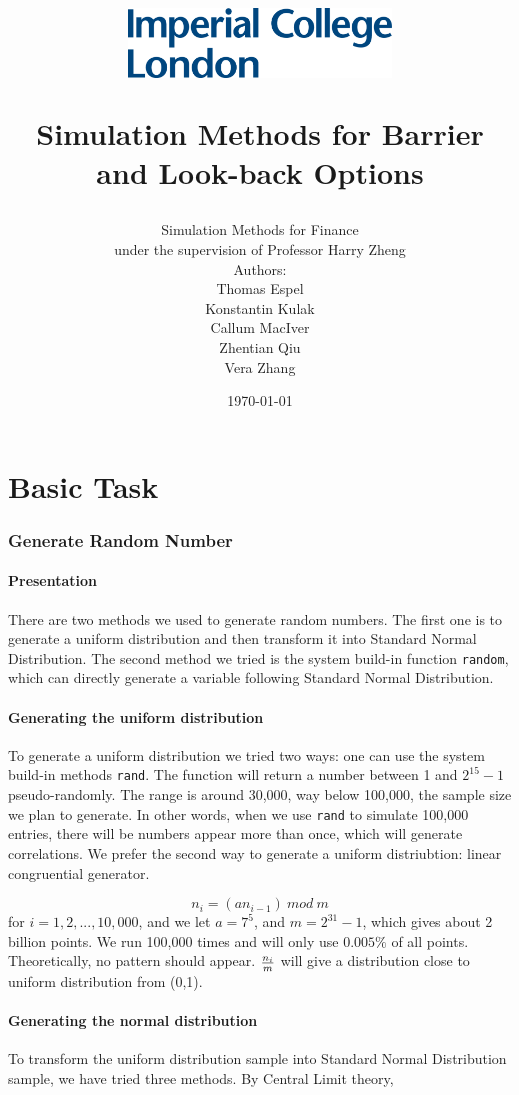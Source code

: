 \documentclass[11pt,a4paper,fleqn]{article}
\author{{\LARGE Simulation Methods for Finance}\\under the supervision of Professor Harry Zheng
\\[5cm] Authors:\\
Thomas Espel\\ Konstantin Kulak\\ Callum MacIver\\Zhentian Qiu\\Vera Zhang\\[6.5cm]}
\title{\vspace*{-2cm}\begin{flushleft}\includegraphics[width=7cm]{imperial.png}\end{flushleft}
\vspace*{4cm}
\Huge\sffamily Simulation Methods for Barrier and Look-back Options}
\date{\sffamily\today}
\begin{document}
\maketitle
\thispagestyle{empty}

\newpage
\tableofcontents
\newpage
{}
\setcounter{page}{1}

\part{Basic Task}
\section{Generate Random Number}
\subsection{Presentation}
There are two methods we used to generate random numbers.
The first one is to generate a uniform distribution and then transform it into Standard Normal Distribution. The second method we tried is the system build-in function \texttt{random}, which can directly generate a variable following Standard Normal Distribution.
\subsection{Generating the uniform distribution}
To generate a uniform distribution we tried two ways: one can use the system build-in methods \texttt{rand}. The function will return a number between 1 and $2^{15} -1$ pseudo-randomly. The range is around 30,000, way below 100,000, the sample size we plan to generate. In other words, when we use \texttt{rand} to simulate 100,000 entries, there will be numbers appear more than once, which will generate correlations. We prefer the second way to generate a uniform distriubtion: linear congruential generator.

$$n_i = (an_{i-1}) \ mod\ m$$for $i=1,2,...,10,000$, and we let $ a = 7^5$, and $m = 2^{31}-1$, which gives about 2 billion points. We run 100,000 times and will only use $0.005\%$ of all points. Theoretically, no pattern should appear. ${n_i \over m}$ will give a distribution close to uniform distribution from (0,1).

\subsection{Generating the normal distribution}
To transform the uniform distribution sample into Standard Normal Distribution sample, we have tried three methods. By Central Limit theory,
\end{document}
